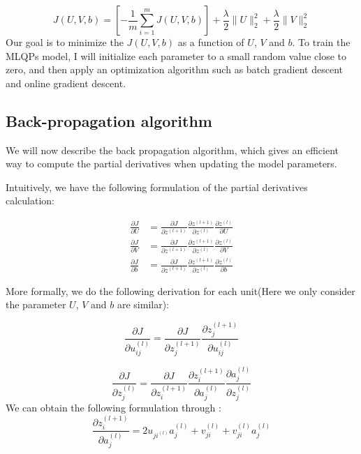 \begin{equation}
J(U,V,b) = [-\frac{1}{m}\sum_{i=1}^{m}{J(U,V,b)}] + \frac{\lambda}{2}\parallel{U}\parallel_{2}^{2} +\frac{\lambda}{2}\parallel{V}\parallel_{2}^{2}
\end{equation}
Our goal is to minimize the $J(U,V,b)$ as a function of $U$, $V$ and $b$. To train the MLQPs model, I will initialize each parameter to a small random value close to zero, and then apply an optimization algorithm such as batch gradient descent and online gradient descent.

\subsection{Back-propagation algorithm}
We will now describe the back propagation algorithm, which gives an efficient way to compute the partial derivatives when updating the model parameters.

Intuitively, we have the following formulation of the partial derivatives calculation:

\begin{equation}
\begin{split}
\frac{\partial{J}}{\partial{U}} &= \frac{\partial{J}}{\partial{z^{(l+1)}}}
\frac{\partial{z^{(l+1)}}}{\partial{z^{(l)}}}\frac{\partial{z^{(l)}}}{\partial{U}}
\\
\frac{\partial{J}}{\partial{V}} &= \frac{\partial{J}}{\partial{z^{(l+1)}}}
\frac{\partial{z^{(l+1)}}}{\partial{z^{(l)}}}\frac{\partial{z^{(l)}}}{\partial{V}}
\\
\frac{\partial{J}}{\partial{b}} &= \frac{\partial{J}}{\partial{z^{(l+1)}}}
\frac{\partial{z^{(l+1)}}}{\partial{z^{(l)}}}\frac{\partial{z^{(l)}}}{\partial{b}}
\end{split}
\end{equation}

More formally, we do the following derivation for each unit(Here we only consider the parameter $U$, $V$ and $b$ are similar):

\begin{equation}
\frac{\partial{J}}{\partial{u_{ij}^{(l)}}}=
\frac{\partial{J}}{\partial{z_j^{(l+1)}}}
\frac{\partial{z_j^{(l+1)}}}{\partial{u_{ij}^{(l)}}}
\end{equation}

\begin{equation}
\frac{\partial{J}}{\partial{z_j^{(l)}}}=
\frac{\partial{J}}{\partial{z_i^{(l+1)}}}
\frac{\partial{z_i^{(l+1)}}}{\partial{a_j^{(l)}}}
\frac{\partial{a_j^{(l)}}}{\partial{z_j^{(l)}}}
\end{equation}
We can obtain the following formulation through \label{unit}:
\begin{equation}
\frac{\partial{z_i^{(l+1)}}}{\partial{a_j^{(l)}}}=
2u_{ji^{(l)}}a_j^{(l)}+v_{ji}^{(l)} + v_{ji}^{(l)}a_j^{(l)}
\end{equation}

